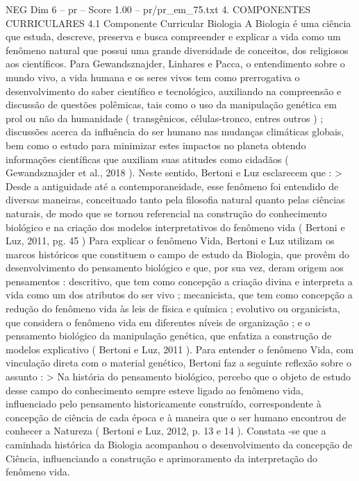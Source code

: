 \begin{textsample}{NEG Dim 6 – pr – Score 1.00 – pr/pr\_em\_75.txt}  \label{ex:f6_neg_263}
4.
COMPONENTES CURRICULARES 4.1 Componente Curricular Biologia A Biologia é uma ciência que estuda, descreve, preserva e busca compreender e explicar a vida como um fenômeno natural que possui uma grande diversidade de conceitos, dos religiosos aos científicos.
Para Gewandsznajder, Linhares e Pacca, o entendimento sobre o mundo vivo, a vida humana e os seres vivos tem como prerrogativa o desenvolvimento do saber científico e tecnológico, auxiliando na compreensão e discussão de questões polêmicas, tais como o uso da manipulação genética em prol ou não da humanidade ( transgênicos, células-tronco, entres outros ) ; discussões acerca da influência do ser humano nas mudanças climáticas globais, bem como o estudo para minimizar estes impactos no planeta obtendo informações científicas que auxiliam suas atitudes como cidadãos ( Gewandsznajder et al., 2018 ).
Neste sentido, Bertoni e Luz esclarecem que : > Desde a antiguidade até a contemporaneidade, esse fenômeno foi entendido de diversas maneiras, conceituado tanto pela filosofia natural quanto pelas ciências naturais, de modo que se tornou referencial na construção do conhecimento biológico e na criação dos modelos interpretativos do fenômeno vida ( Bertoni e Luz, 2011, pg. 45 ) Para explicar o fenômeno Vida, Bertoni e Luz utilizam os marcos históricos que constituem o campo de estudo da Biologia, que provêm do desenvolvimento do pensamento biológico e que, por sua vez, deram origem aos pensamentos : descritivo, que tem como concepção a criação divina e interpreta a vida como um dos atributos do ser vivo ; mecanicista, que tem como concepção a redução do fenômeno vida às leis de física e química ; evolutivo ou organicista, que considera o fenômeno vida em diferentes níveis de organização ; e o pensamento biológico da manipulação genética, que enfatiza a construção de modelos explicativo ( Bertoni e Luz, 2011 ).
Para entender o fenômeno Vida, com vinculação direta com o material genético, Bertoni faz a seguinte reflexão sobre o assunto : > Na história do pensamento biológico, percebo que o objeto de estudo desse campo do conhecimento sempre esteve ligado ao fenômeno vida, influenciado pelo pensamento historicamente construído, correspondente à concepção de ciência de cada época e à maneira que o ser humano encontrou de conhecer a Natureza ( Bertoni e Luz, 2012, p. 13 e 14 ).
Constata -se que a caminhada histórica da Biologia acompanhou o desenvolvimento da concepção de Ciência, influenciando a construção e aprimoramento da interpretação do fenômeno vida.

\end{textsample}
